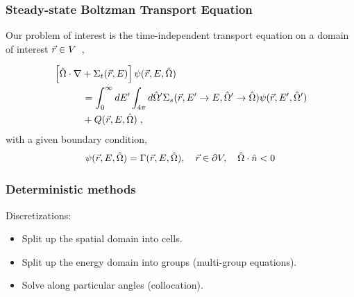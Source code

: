 \documentclass[xcolor=x11names, compress, handout]{beamer}
\begin{document}
\begin{frame}
  \frametitle{Steady-state Boltzman Transport Equation}
  Our problem of interest is the time-independent transport equation
  on a domain of interest $\vec{r} \in V$~\cite{lewis1993},
  
\begin{align*}
  &\left[ \hat{\Omega}\cdot  \nabla + \Sigma_t(\vec{r},E) \right] \psi(\vec{r},E,\hat{\Omega})\\
  & \quad \quad \quad= \int_0^{\infty}dE'\int_{4\pi}d\hat{\Omega}'\Sigma_s(\vec{r}, E'\rightarrow E,\hat{\Omega}'\rightarrow\hat{\Omega})
    \psi(\vec{r},E',\hat{\Omega}') \\ & \quad \quad \quad+ Q(\vec{r}, E, \hat{\Omega})\;,
\end{align*}
with a given boundary condition,
\begin{align*}
  \psi(\vec{r},E,\hat{\Omega}) = \Gamma(\vec{r}, E, \hat{\Omega}), \quad \vec{r} \in \partial V,
  \quad \hat{\Omega} \cdot \hat{n} < 0
\end{align*}  
\end{frame}
\begin{frame}
  \frametitle{Deterministic methods}
  Discretizations:
  \begin{itemize}
  \item<1-> Split up the spatial domain into cells.
  \item<2-> Split up the energy domain into groups (multi-group equations).    
  \item<3-> Solve along particular angles (collocation).
  \end{itemize}
\end{frame}
\end{document}
